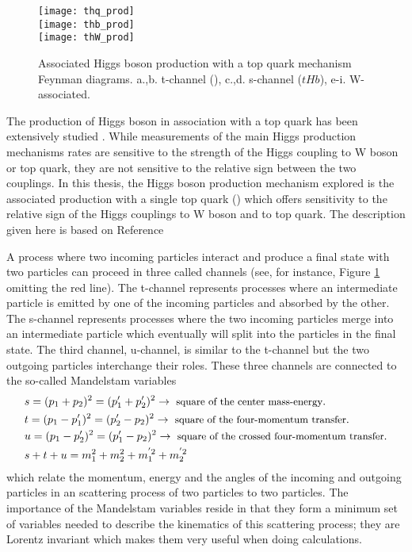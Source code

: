 \begin{figure}[h!]
\centering
\texttt{[image: thq\_prod]}\\
\texttt{[image: thb\_prod]}\\
\texttt{[image: thW\_prod]}\\
\caption[Higgs boson production in association with a top quark]{Associated Higgs boson production with a top quark mechanism Feynman diagrams. a.,b. t-channel (\tHq), c.,d. s-channel ($tHb$), e-i. W-associated.}
\label{fig:th_prod}
\end{figure}

The production of Higgs boson in association with a top quark has been extensively studied \cite{maltoni1, biswas, farina,tait, maltoni2}. While measurements of the main Higgs production mechanisms rates are sensitive to the strength of the Higgs coupling to W boson or top quark, they are not sensitive to the relative sign between the two couplings. In this thesis, the Higgs boson production mechanism explored is the associated production with a single top quark (\tH) which offers sensitivity to the relative sign of the Higgs couplings to W boson and to top quark. The description given here is based on Reference \cite{farina}

A process where two incoming particles interact and produce a final state with two particles can proceed in three called channels (see, for instance, Figure \ref{fig:th_prod} omitting the red line). The t-channel represents processes where an intermediate particle is emitted by one of the incoming particles and absorbed by the other. The s-channel represents processes where the two incoming particles merge into an intermediate particle which eventually will split into the particles in the final state. The third channel, u-channel, is similar to the t-channel but the two outgoing particles interchange their roles. These three channels are connected to the so-called Mandelstam variables 
\begin{align}
&s =(p_1 +p_2)^2 =(p_1' + p_2')^2 \to{\small \textrm{ square of the center mass-energy}}.\\
&t =(p_1 -p_1')^2 =(p_2' -p_2)^2 \to{\small \textrm{ square of the four-momentum transfer}}.\\
&u =(p_1 -p_2')^2 =(p_1' - p_2)^2 \to{\small \textrm{ square of the crossed four-momentum transfer}}.\\
&s+t+u = m_1^2 + m_2^2 + m_1^{'2} +  m_2^{'2}
\end{align}
\noindent which relate the momentum, energy and the angles of the incoming and outgoing particles in an scattering process of two particles to two particles. The importance of the Mandelstam variables reside in that they form a minimum set of variables needed to describe the kinematics of this scattering process; they are Lorentz invariant which makes them very useful when doing calculations.      

